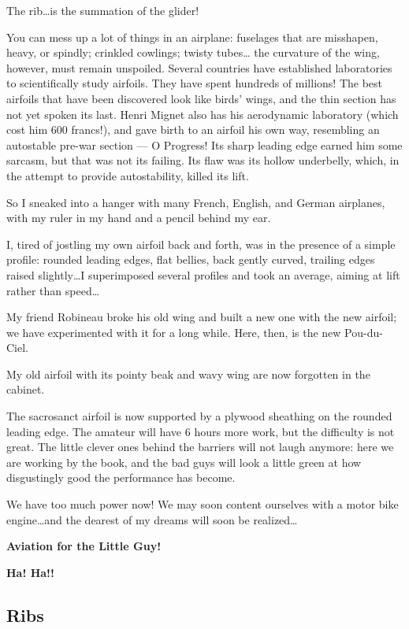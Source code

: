 \documentclass{book}
\begin{document}
The rib\ldots is the summation of the glider!

You can mess up a lot of things in an airplane: fuselages that are
misshapen, heavy, or spindly; crinkled cowlings; twisty tubes\ldots
the curvature of the wing, however, must remain unspoiled.  Several
countries have established laboratories to scientifically study
airfoils.  They have spent hundreds of millions!  The best airfoils
that have been discovered look like birds' wings, and the thin section
has not yet spoken its last.  Henri Mignet also has his aerodynamic
laboratory (which cost him 600 francs!), and gave birth to an airfoil
his own way, resembling an autostable pre-war section --- O Progress!
Its sharp leading edge earned him some sarcasm, but that was not its
failing.  Its flaw was its hollow underbelly, which, in the attempt to
provide autostability, killed its lift.

So I sneaked into a hanger with many French, English, and German
airplanes, with my ruler in my hand and a pencil behind my ear.

I, tired of jostling my own airfoil back and forth, was in the
presence of a simple profile: rounded leading edges, flat bellies,
back gently curved, trailing edges raised slightly\ldots I
superimposed several profiles and took an average, aiming at lift
rather than speed\ldots

My friend Robineau broke his old wing and built a new one with the new
airfoil; we have experimented with it for a long while.  Here, then,
is the new Pou-du-Ciel.

My old airfoil with its pointy beak and wavy wing are now forgotten in
the cabinet.

The sacrosanct airfoil is now supported by a plywood sheathing on the
rounded leading edge.  The amateur will have 6 hours more work, but
the difficulty is not great.  The little clever ones behind the
barriers will not laugh anymore: here we are working by the book, and
the bad guys will look a little green at how disgustingly good the
performance has become.

We have too much power now!  We may soon content ourselves with a
motor bike engine\ldots and the dearest of my dreams will soon be
realized\ldots

\begin{center}
  {\large \textbf{Aviation for the Little Guy!}
    
    \textbf{Ha! Ha!!}}
\end{center}

\subsection{Ribs}
\end{document}
